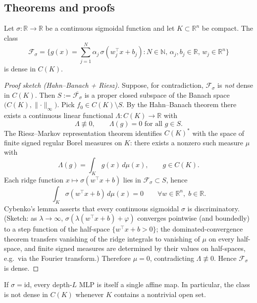\subsection*{Theorems and proofs}

\begin{theorem}\label{thm:uat}
Let $\sigma : \mathbb{R} \to \mathbb{R}$ be a continuous sigmoidal function and let $K \subset \mathbb{R}^n$ be compact. The class
\[
\mathcal{F}_\sigma = \Big\{ g(x) = \sum_{j=1}^{N} \alpha_j\, \sigma(w_j^\top x + b_j) : N \in \mathbb{N},\, \alpha_j, b_j \in \mathbb{R},\, w_j \in \mathbb{R}^n \Big\}
\]
is dense in $C(K)$.
\end{theorem}

\begin{proof}[Proof sketch (Hahn--Banach + Riesz)]
Suppose, for contradiction, $\mathcal{F}_\sigma$ is \emph{not} dense in $C(K)$. Then $S := \overline{\mathcal{F}_\sigma}$ is a proper closed subspace of the Banach space $\big(C(K), \lVert \cdot \rVert_\infty\big)$. Pick $f_0 \in C(K) \setminus S$. By the Hahn--Banach theorem there exists a continuous linear functional $\Lambda : C(K) \to \mathbb{R}$ with
\[
\Lambda \not\equiv 0, \qquad \Lambda(g) = 0 \text{ for all } g \in S.
\]
The Riesz--Markov representation theorem identifies $C(K)^*$ with the space of finite signed regular Borel measures on $K$: there exists a nonzero such measure $\mu$ with
\[
\Lambda(g) = \int_K g(x)\, d\mu(x), \qquad g \in C(K).
\]
Each ridge function $x \mapsto \sigma(w^\top x + b)$ lies in $\mathcal{F}_\sigma \subset S$, hence
\[
\int_K \sigma(w^\top x + b)\, d\mu(x) = 0 \qquad \forall w \in \mathbb{R}^n,\; b \in \mathbb{R}.
\]
Cybenko's lemma asserts that every continuous sigmoidal $\sigma$ is discriminatory. (Sketch: as $\lambda \to \infty$, $\sigma(\lambda(w^\top x + b) + \varphi)$ converges pointwise (and boundedly) to a step function of the half-space $\{w^\top x + b > 0\}$; the dominated-convergence theorem transfers vanishing of the ridge integrals to vanishing of $\mu$ on every half-space, and finite signed measures are determined by their values on half-spaces, e.g.\ via the Fourier transform.) Therefore $\mu = 0$, contradicting $\Lambda \not\equiv 0$. Hence $\mathcal{F}_\sigma$ is dense.
\end{proof}

\begin{proposition}\label{prop:linear-collapse}
If $\sigma = \mathrm{id}$, every depth-$L$ MLP is itself a single affine map. In particular, the class is not dense in $C(K)$ whenever $K$ contains a nontrivial open set.
\end{proposition}

